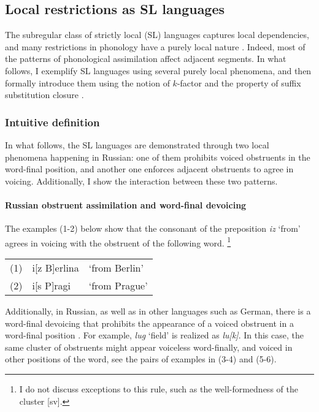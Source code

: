 \subsection{Local restrictions as SL languages}
\label{russianwfdpatternn}

The subregular class of strictly local (SL) languages captures local dependencies, and many restrictions in phonology have a purely local nature \citep{RogersPullum2011}.
Indeed, most of the patterns of phonological assimilation affect adjacent segments.
In what follows, I exemplify SL languages using several purely local phenomena, and then formally introduce them using the notion of $k$-factor and the property of suffix substitution closure \citep{RogersEtAl13}.

\subsubsection{Intuitive definition}

In what follows, the SL languages are demonstrated through two local phenomena happening in Russian: one of them prohibits voiced obstruents in the word-final position, and another one enforces adjacent obstruents to agree in voicing.
Additionally, I show the interaction between these two patterns.

\paragraph{Russian obstruent assimilation and word-final devoicing}
The examples (1-2) below show that the consonant of the preposition \emph{iz} `from' agrees in voicing with the obstruent of the following word.%
\footnote{I do not discuss exceptions to this rule, such as the well-formedness of the cluster [sv].}

\medskip
\begin{tabular}{lll}
(1) & i[z B]erlina & `from Berlin' \\
(2) & i[s P]ragi & `from Prague'
\end{tabular}
\medskip

Additionally, in Russian, as well as in other languages such as German, there is a word-final devoicing that prohibits the appearance of a voiced obstruent in a word-final position \citep{Wiebke1995,Padgett2002ms}.
For example, \emph{lug} `field' is realized as \emph{lu[k]}.
In this case, the same cluster of obstruents might appear voiceless word-finally, and voiced in other positions of the word, see the pairs of examples in (3-4) and (5-6).

